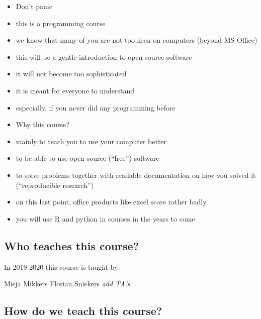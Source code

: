 \documentclass[]{book}
\providecommand{\tightlist}{%
  \setlength{\itemsep}{0pt}\setlength{\parskip}{0pt}}
\begin{document}
\begin{itemize}
\tightlist
\item
  Don't panic
\item
  this is a programming course
\item
  we know that many of you are not too keen on computers (beyond MS
  Office)
\item
  this will be a gentle introduction to open source software
\item
  it will not become too sophisticated
\item
  it is meant for everyone to understand
\item
  especially, if you never did any programming before
\item
  Why this course?
\item
  mainly to teach you to use your computer better
\item
  to be able to use open source (``free'') software
\item
  to solve problems together with readable documentation on how you
  solved it (``reproducible research'')
\item
  on this last point, office products like excel score rather badly
\item
  you will use R and python in courses in the years to come
\end{itemize}

\subsection{Who teaches this course?}\label{who-teaches-this-course}

In 2019-2020 this course is taught by:

Misja Mikkers Florian Sniekers \emph{add TA's}

\subsection{How do we teach this
course?}\label{how-do-we-teach-this-course}
\end{document}
